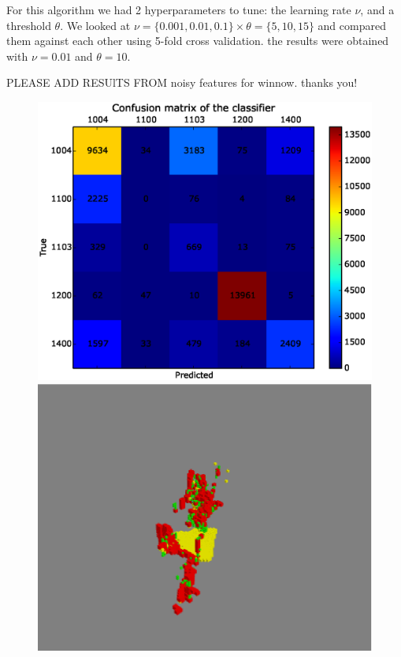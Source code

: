 \documentclass[10pt,a4paper]{article}
\begin{document}
For this algorithm we had 2 hyperparameters to tune: the learning rate $\nu$, and a threshold $\theta$. We looked at $\nu = \{0.001,0.01,0.1\} \times \theta = \{5,10,15\}$ and compared them against each other using 5-fold cross validation. the results were obtained with $\nu = 0.01$ and $\theta = 10$.

{\color{blue} PLEASE ADD RESUlTS FROM noisy features for winnow. thanks you!}
\begin{figure}[htp]
\centering
\includegraphics[scale=0.4,trim = 0.3 0.3 0.3 0.3,clip]{figs/winnow_amtoan_test1.eps}
\includegraphics[scale=0.4]{figs/winnow_amtoan_test1_plot.eps}

\end{figure}
\end{document}
